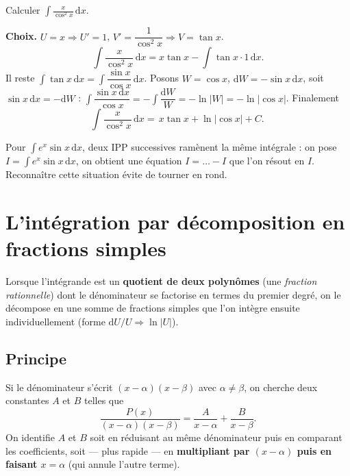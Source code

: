 \documentclass[11pt,a4paper]{article}
\newcommand{\dd}{\mathrm{d}}
\begin{document}
\begin{exemple}
Calculer $\displaystyle\int \frac{x}{\cos^2 x}\,\dd x$.

\smallskip
\textbf{Choix.} $U=x\Rightarrow U'=1$, $V'=\dfrac1{\cos^2 x}\Rightarrow V=\tan x$.
\[
\int \frac{x}{\cos^2 x}\,\dd x=x\tan x-\int \tan x\cdot 1\,\dd x.
\]
Il reste $\int\tan x\,\dd x=\int\dfrac{\sin x}{\cos x}\,\dd x$. Posons $W=\cos x$, $\dd W=-\sin x\,\dd x$,
soit $\sin x\,\dd x=-\dd W$ : $\int\dfrac{\sin x\,\dd x}{\cos x}=-\int\dfrac{\dd W}{W}=-\ln|W|=-\ln|\cos x|$.
Finalement
\[
\int \frac{x}{\cos^2 x}\,\dd x=\boxed{\,x\tan x+\ln|\cos x|+C.\,}
\]
\end{exemple}

\begin{remarque}
Pour $\int e^x\sin x\,\dd x$, deux IPP successives ramènent la même intégrale : on pose
$I=\int e^x\sin x\,\dd x$, on obtient une équation $I=\ldots-I$ que l'on résout en $I$. Reconnaître
cette situation évite de tourner en rond.
\end{remarque}

\section{L'intégration par décomposition en fractions simples}

Lorsque l'intégrande est un \textbf{quotient de deux polynômes} (une \emph{fraction rationnelle})
dont le dénominateur se factorise en termes du premier degré, on le décompose en une somme de
fractions simples que l'on intègre ensuite individuellement (forme $\dd U/U\Rightarrow\ln|U|$).

\subsection{Principe}

Si le dénominateur s'écrit $(x-\alpha)(x-\beta)$ avec $\alpha\neq\beta$, on cherche deux constantes
$A$ et $B$ telles que
\[
\frac{P(x)}{(x-\alpha)(x-\beta)}=\frac{A}{x-\alpha}+\frac{B}{x-\beta}.
\]
On identifie $A$ et $B$ soit en réduisant au même dénominateur puis en comparant les coefficients,
soit — plus rapide — en \textbf{multipliant par $(x-\alpha)$ puis en faisant $x=\alpha$} (qui annule
l'autre terme).
\end{document}
